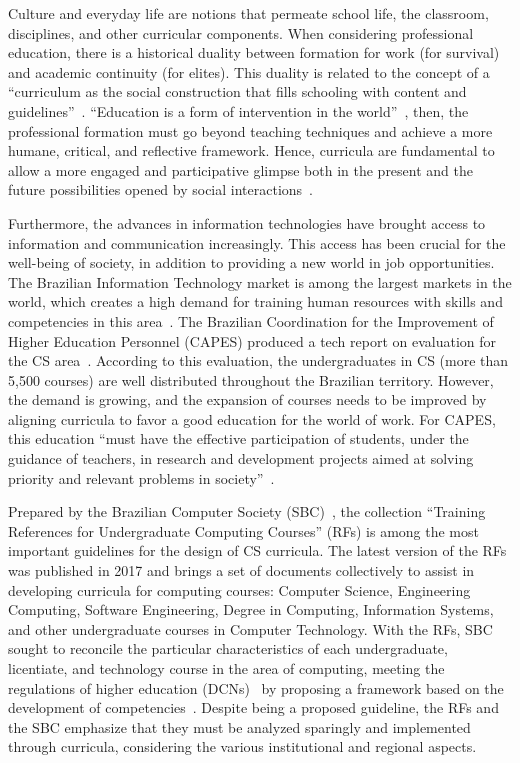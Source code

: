 \documentclass[sigconf, review]{educomp}
\begin{document}
Culture and everyday life are notions that permeate school life, the classroom, disciplines, and other curricular components.
When considering professional education, there is a historical duality between formation for work (for survival) and academic continuity (for elites).
This duality is related to the concept of a ``curriculum as the social construction that fills schooling with content and guidelines''~\cite{gimeno2000curriculo}.
``Education is a form of intervention in the world''~\cite{freire2002pedagogia}, then, the professional formation must go beyond teaching techniques and achieve a more humane, critical, and reflective framework.
Hence, curricula are fundamental to allow a more engaged and participative glimpse both in the present and the future possibilities opened by social interactions~\cite{souza2010}.

Furthermore, the advances in information technologies have brought access to information and communication increasingly.
This access has been crucial for the well-being of society, in addition to providing a new world in job opportunities.
The Brazilian Information Technology market is among the largest markets in the world, which creates a high demand for training human resources with skills and competencies in this area~\cite{capes2019}.
The Brazilian Coordination for the Improvement of Higher Education Personnel (CAPES) produced a tech report on evaluation for the CS area~\cite{capes2019}.
According to this evaluation, the undergraduates in CS (more than 5,500 courses) are well distributed throughout the Brazilian territory.
However, the demand is growing, and the expansion of courses needs to be improved by aligning curricula to favor a good education for the world of work.
For CAPES, this education ``must have the effective participation of students, under the guidance of teachers, in research and development projects aimed at solving priority and relevant problems in society''~\cite{capes2019}.

Prepared by the Brazilian Computer Society (SBC)~\cite{sbc2019}, the collection ``Training References for Undergraduate Computing Courses'' (RFs) is among the most important guidelines for the design of CS curricula.
The latest version of the RFs was published in 2017 and brings a set of documents collectively to assist in developing curricula for computing courses: Computer Science, Engineering Computing, Software Engineering, Degree in Computing, Information Systems, and other undergraduate courses in Computer Technology.
With the RFs, SBC sought to reconcile the particular characteristics of each undergraduate, licentiate, and technology course in the area of computing, meeting the regulations of higher education (DCNs)~\cite{dcn2016} by proposing a framework based on the development of competencies~\cite{sbc2019}.
Despite being a proposed guideline, the RFs and the SBC emphasize that they must be analyzed sparingly and implemented through curricula, considering the various institutional and regional aspects.
\end{document}
